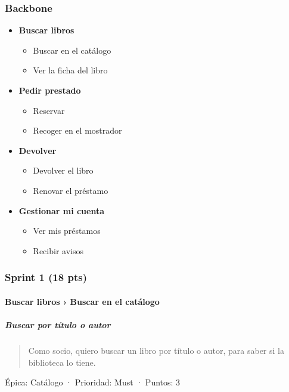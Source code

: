 \subsubsection*{Backbone}

\begin{itemize}
\item \textbf{Buscar libros}

\begin{itemize}
\item Buscar en el catálogo
\item Ver la ficha del libro
\end{itemize}
\item \textbf{Pedir prestado}

\begin{itemize}
\item Reservar
\item Recoger en el mostrador
\end{itemize}
\item \textbf{Devolver}

\begin{itemize}
\item Devolver el libro
\item Renovar el préstamo
\end{itemize}
\item \textbf{Gestionar mi cuenta}

\begin{itemize}
\item Ver mis préstamos
\item Recibir avisos
\end{itemize}
\end{itemize}

\subsubsection*{Sprint 1 (18 pts)}

\paragraph*{Buscar libros › Buscar en el catálogo}

\subparagraph*{Buscar por título o autor}

\begin{quote}
Como socio, quiero buscar un libro por título o autor, para saber si la biblioteca lo tiene.
\end{quote}

Épica: Catálogo · Prioridad: Must · Puntos: 3

